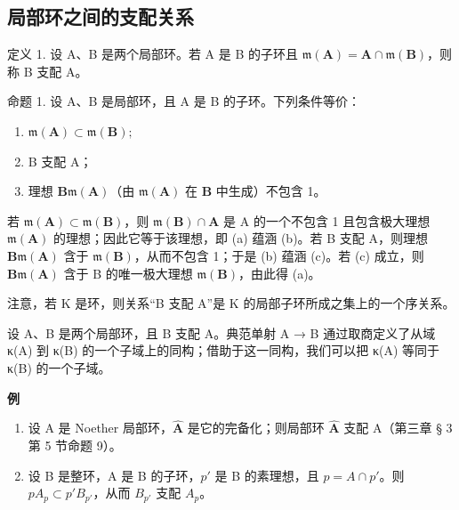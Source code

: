 \subsection{局部环之间的支配关系}

定义 1. 设 A、B 是两个局部环。若 A 是 B 的子环且 \(\mathfrak{m}(\mathbf{A}) = \mathbf{A} \cap \mathfrak{m}(\mathbf{B})\)，则称 B 支配 A。

命题 1. 设 A、B 是局部环，且 A 是 B 的子环。下列条件等价：

\begin{enumerate}
\def\labelenumi{(\alph{enumi})}
\item
  \(\mathfrak{m}(\mathbf{A}) \subset \mathfrak{m}(\mathbf{B});\)
\item
  B 支配 A；
\item
  理想 \(\mathbf{B}\mathfrak{m}(\mathbf{A})\)（由 \(\mathfrak{m}(\mathbf{A})\) 在 \(\mathbf{B}\) 中生成）不包含 1。
\end{enumerate}

若 \(\mathfrak{m}(\mathbf{A}) \subset \mathfrak{m}(\mathbf{B})\)，则 \(\mathfrak{m}(\mathbf{B}) \cap \mathbf{A}\) 是 A 的一个不包含 1 且包含极大理想 \(\mathfrak{m}(\mathbf{A})\) 的理想；因此它等于该理想，即 (a) 蕴涵 (b)。若 B 支配 A，则理想 \(\mathbf{B}\mathfrak{m}(\mathbf{A})\) 含于 \(\mathfrak{m}(\mathbf{B})\)，从而不包含 1；于是 (b) 蕴涵 (c)。若 (c) 成立，则 \(\mathbf{B}\mathfrak{m}(\mathbf{A})\) 含于 B 的唯一极大理想 \(\mathfrak{m}(\mathbf{B})\)，由此得 (a)。

注意，若 K 是环，则关系“B 支配 A”是 K 的局部子环所成之集上的一个序关系。

设 A、B 是两个局部环，且 B 支配 A。典范单射 A → B 通过取商定义了从域 κ(A) 到 κ(B) 的一个子域上的同构；借助于这一同构，我们可以把 κ(A) 等同于 κ(B) 的一个子域。

\textbf{例}\par

\begin{enumerate}
\def\labelenumi{(\arabic{enumi})}
\item
  设 A 是 Noether 局部环，\(\hat{\mathbf{A}}\) 是它的完备化；则局部环 \(\hat{\mathbf{A}}\) 支配 A（第三章 § 3 第 5 节命题 9）。
\item
  设 B 是整环，A 是 B 的子环，\(p'\) 是 B 的素理想，且 \(p = A \cap p'\)。则 \(pA_{p} \subset p'B_{p'}\)，从而 \(B_{p'}\) 支配 \(A_{p}\)。
\end{enumerate}

